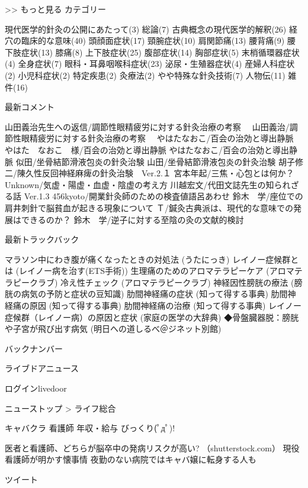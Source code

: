 >> もっと見る
カテゴリー

    現代医学的針灸の公開にあたって(3)
    総論(7)
    古典概念の現代医学的解釈(26)
    経穴の臨床的な意味(40)
    頭顔面症状(17)
    頸腕症状(10)
    肩関節痛(13)
    腰背痛(9)
    腰下肢症状(13)
    膝痛(8)
    上下肢症状(25)
    腹部症状(14)
    胸部症状(5)
    末梢循環器症状(4)
    全身症状(7)
    眼科・耳鼻咽喉科症状(23)
    泌尿・生殖器症状(4)
    産婦人科症状(2)
    小児科症状(2)
    特定疾患(2)
    灸療法(2)
    やや特殊な針灸技術(7)
    人物伝(11)
    雑件(16)

最新コメント

    山田義治先生への返信/調節性眼精疲労に対する針灸治療の考察　
    山田義治/調節性眼精疲労に対する針灸治療の考察　
    やはたなおこ/百会の治効と導出静脈
    やはた　なおこ　様/百会の治効と導出静脈
    やはたなおこ/百会の治効と導出静脈
    似田/坐骨結節滑液包炎の針灸治験
    山田/坐骨結節滑液包炎の針灸治験
    胡子修二/陳久性反回神経麻痺の針灸治験　Ver.2.１
    宮本年起/三焦・心包とは何か？
    Unknown/気虚・陽虚・血虚・陰虚の考え方
    川越宏文/代田文誌先生の知られざる話 Ver.1.3
    456kyoto/開業針灸師のための検査値語呂あわせ
    鈴木　学/座位での肩井刺針で脳貧血が起きる現象について
    Ｔ/鍼灸古典派は、現代的な意味での発展はできるのか？
    鈴木　学/逆子に対する至陰の灸の文献的検討

最新トラックバック

    マラソン中にわき腹が痛くなったときの対処法 (うたにっき)
    レイノー症候群とは (レイノー病を治す(ETS手術))
    生理痛のためのアロマテラピーケア (アロマテラピークラブ)
    冷え性チェック (アロマテラピークラブ)
    神経因性膀胱の療法 (膀胱の病気の予防と症状の豆知識)
    肋間神経痛の症状 (知って得する事典)
    肋間神経痛の原因 (知って得する事典)
    肋間神経痛の治療 (知って得する事典)
    レイノー症候群（レイノー病）の原因と症状 (家庭の医学の大辞典)
    ◆骨盤臓器脱：膀胱や子宮が飛び出す病気 (明日への道しるべ＠ジネット別館)

バックナンバー






ライブドアニュース

    ログインlivedoor

ニューストップ > ライフ総合

    キャバクラ 看護師 年収・給与 びっくり(ﾟдﾟ)! 

医者と看護師、どちらが脳卒中の発病リスクが高い? （shutterstock.com）
現役看護師が明かす懐事情 夜勤のない病院ではキャバ嬢に転身する人も

    ツイート

